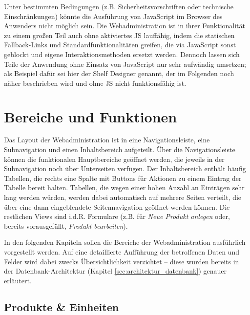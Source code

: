 Unter bestimmten Bedingungen (z.B. Sicherheitsvorschriften oder technische Einschränkungen) könnte die Ausführung von JavaScript im Browser des Anwenders nicht möglich sein. Die Webadministration ist in ihrer Funktionalität zu einem großen Teil auch ohne aktiviertes \acs{JS} lauffähig, indem die statischen Fallback-Links und Standardfunktionalitäten greifen, die via JavaScript sonst geblockt und eigene Interaktionsmethoden ersetzt werden. Dennoch lassen sich Teile der Anwendung ohne Einsatz von JavaScript nur sehr aufwändig umsetzen; als Beispiel dafür sei hier der Shelf Designer genannt, der im Folgenden noch näher beschrieben wird und ohne \acs{JS} nicht funktionsfähig ist.


\section{Bereiche und Funktionen}

Das Layout der Webadministration ist in eine Navigationsleiste, eine Subnavigation und einen Inhaltsbereich aufgeteilt. Über die Navigationsleiste können die funktionalen Hauptbereiche geöffnet werden, die jeweils in der Subnavigation noch über Unterseiten verfügen. Der Inhaltsbereich enthält häufig Tabellen, die rechts eine Spalte mit Buttons für Aktionen zu einem Eintrag der Tabelle bereit halten. Tabellen, die wegen einer hohen Anzahl an Einträgen sehr lang werden würden, werden dabei automatisch auf mehrere Seiten verteilt, die über eine dann eingeblendete Seitennavigation geöffnet werden können. Die restlichen Views sind i.d.R. Formulare (z.B. für \emph{Neue Produkt anlegen} oder, bereits vorausgefüllt, \emph{Produkt bearbeiten}).

In den folgenden Kapiteln sollen die Bereiche der Webadministration ausführlich vorgestellt werden. Auf eine detaillierte Aufführung der betroffenen Daten und Felder wird dabei zwecks Übersichtlichkeit verzichtet -- diese wurden bereits in der Datenbank-Architektur (Kapitel \ref{sec:architektur_datenbank}) genauer erläutert.


\subsection{Produkte \& Einheiten}

